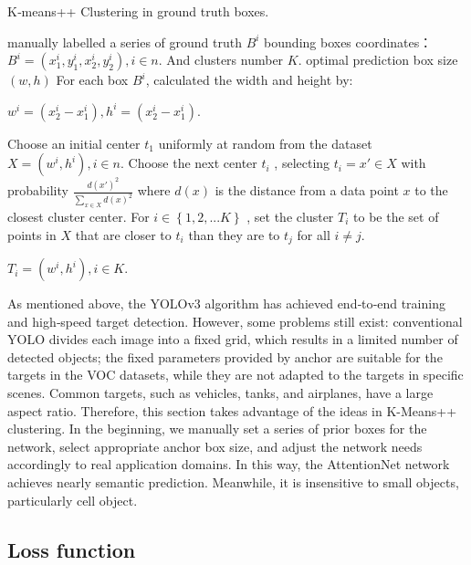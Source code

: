 \begin{algorithm}[h]
  \caption{K‐means++ Clustering in ground truth boxes.}
  \label{alg:Framwork}
  \begin{algorithmic}[1]
    \Require
    manually labelled a series of ground truth $B^{i}$ bounding boxes coordinates：
     $B^{i}=\left ( x_{1}^{i},y_{1}^{i},x_{2}^{i},y_{2}^{i} \right ), i\in n.$ And clusters number $K$.
    \Ensure
    optimal  prediction box size $\left ( w,h \right )$
    \State For each box $B^{i}$, calculated the width and height by:
    
    $w^{i}=(x_{2}^{i}-x_{1}^{i}), h^{i}=(x_{2}^{i}-x_{1}^{i})$.
    
    \State Choose an initial center $t_{1}$ uniformly at random from the dataset $X=(w^{i},h^{i}),i\in n$.
       \State Choose the next center $t_{i}$ , selecting $t_{i}={x}'\in X $ with probability $\frac{d ( {x}')^{2}}{\sum_{x\in X}^{}d\left ( x \right )^{2} }$
where $d\left ( x \right )$ is the distance from a data point $x$ to the closest cluster center.
       \State For $i \in \left \{ 1,2,...K \right \}$ , set the cluster $T_{i}$ to be the set of points in $X$ that are closer to
$t_{i}$ than they are to $t_{j}$ for all $i\neq j$.
    
  
    \Return $T_{i}=(w^{i},h^{i}),i \in K$.
  \end{algorithmic}
\end{algorithm}

As mentioned above, the YOLOv3\cite{33} algorithm has achieved end‐to‐end training and high‐speed target detection. However, some problems still exist: conventional YOLO \cite{yolov1} divides each image into a fixed grid, which results in a limited number of detected objects;  the fixed parameters provided by anchor are suitable for the targets in the VOC datasets, while they are not adapted to the targets in specific scenes. Common targets, such as vehicles, tanks, and airplanes, have a large aspect ratio. Therefore, this section takes advantage of the ideas in K-Means++ clustering. In the beginning,  we manually set a series of prior boxes for the network, select appropriate anchor box size, and adjust the network needs accordingly to real application domains. In this way, the AttentionNet network achieves nearly semantic prediction. Meanwhile, it is insensitive to small objects, particularly cell object.



\subsection{Loss function} %
\label{sub:citations}

